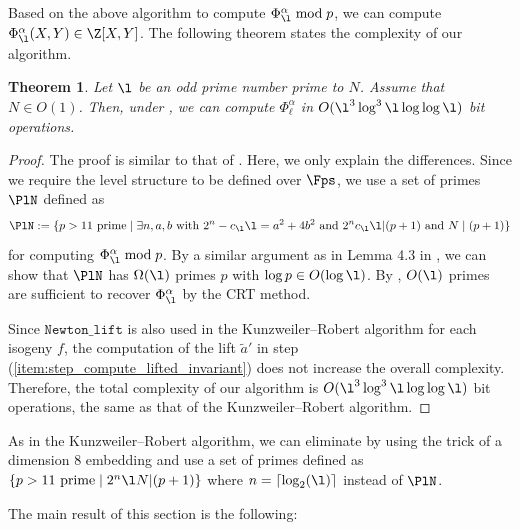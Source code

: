 \documentclass{amsart}
\newtheorem{theorem}{Theorem}[section]
\theoremstyle{definition}
\theoremstyle{remark}
\numberwithin{equation}{section}
\begin{document}
Based on the above algorithm to compute $\Phi_{\l}^\alpha \bmod p$,
we can compute $\Phi_{\l}^\alpha(X,Y) \in \Z[X,Y]$.
The following theorem states the complexity of our algorithm.
\begin{theorem}\label{thm:complexity}
    Let $\l$ be an odd prime number prime to $N$.
    Assume that $N \in O(1)$.
    Then,
    under ,
    we can compute $\Phi_\ell^\alpha$ in
    $O(\l^3 \log^3 \l \log\log \l)$ bit operations.
\end{theorem}
\begin{proof}
    The proof is similar to that of \cite[Theorem 4.4]{deformation_Kunzweiler_2024}.
    Here, we only explain the differences.
    Since we require the level structure to be defined over $\Fps$,
    we use a set of primes $\PlN$ defined as
    \[
        \PlN:=\{p>11~ \text{prime}\mid \exists n,a,b~\text{with}~2^n-c_{\l}\l=a^2+4b^2~\text{and}~2^nc_{\l}\l|(p+1)~\text{and}~N\mid(p+1)\}
    \]
    for computing $\Phi_{\l}^\alpha \bmod p$.
    By a similar argument as in Lemma 4.3 in \cite{deformation_Kunzweiler_2024},
    we can show that
    $\PlN$ has $\Omega(\l)$ primes $p$ with $\log p \in O(\log \l)$.
    By ,
    $O(\l)$ primes are sufficient to recover $\Phi_{\l}^\alpha$ by the CRT method.

    Since $\mathtt{Newton\_lift}$ is also used in the Kunzweiler--Robert algorithm
    for each isogeny $f$,
    the computation of the lift $\tilde{a}'$ in step (\ref{item:step_compute_lifted_invariant})
    does not increase the overall complexity.
    Therefore, the total complexity of our algorithm is
    $O(\l^3 \log^3 \l \log\log \l)$ bit operations, the same 
    as that of the Kunzweiler--Robert algorithm.
\end{proof}
As in the Kunzweiler--Robert algorithm,
we can eliminate 
by using the trick of a dimension 8 embedding
and use a set of primes defined as
$\{p>11~ \text{prime}\mid 2^n\l N|(p+1)\}$
where $n=\lceil\log_2(\l)\rceil$ instead of $\PlN$.
\iffalse


The main result of this section is the following: 
\end{document}
